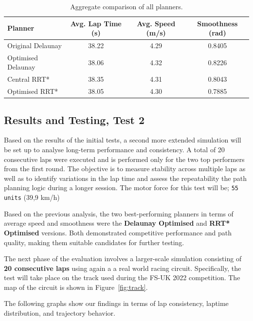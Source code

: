 \documentclass[a4paper,11pt]{report}
\begin{document}
\begin{table}[H]
    \centering
    \begin{tabular}{|l|c|c|c|}
    \hline 
    \textbf{Planner} & \textbf{Avg. Lap Time (s)} & \textbf{Avg. Speed (m/s)} & \textbf{Smoothness (rad)} \\
    \hline
    Original Delaunay & 38.22 & 4.29 & 0.8405 \\
    Optimised Delaunay & 38.06 & 4.32 & 0.8226 \\
    Central RRT* & 38.35 & 4.31 & 0.8043 \\
    Optimised RRT* & 38.05 & 4.30 & 0.7885 \\
    \hline
    \end{tabular}
    \caption{Aggregate comparison of all planners.}
    \label{tab:summary}
    \end{table}
        
    
\subsection{Results and Testing, Test 2}

Based on the results of the initial tests, a second more extended simulation will be set up to analyse long-term
performance and consistency. A total of 20 consecutive laps were executed and is performed only for the two top
performers from the first round. The objective is to measure stability
across multiple laps as well as to identify variations in the lap time and assess the repeatability
the path planning logic during a longer session. The motor force for this test will be; \texttt{55 units} (39,9 km/h)

Based on the previous analysis, the two best-performing planners in terms of average 
speed and smoothness were the \textbf{Delaunay Optimised} and \textbf{RRT* Optimised} versions. 
Both demonstrated competitive performance and path quality, making them suitable candidates for 
further testing.

The next phase of the evaluation involves a larger-scale simulation consisting of \textbf{20 consecutive laps} 
using again a  a real world racing circuit. Specifically, the test will take place on the 
track used during the FS-UK 2022 competition. The map of the circuit is shown in Figure~\ref{fig:track}.

The following graphs show our findings in terms of lap consistency, laptime distribution, and trajectory behavior.
\end{document}
